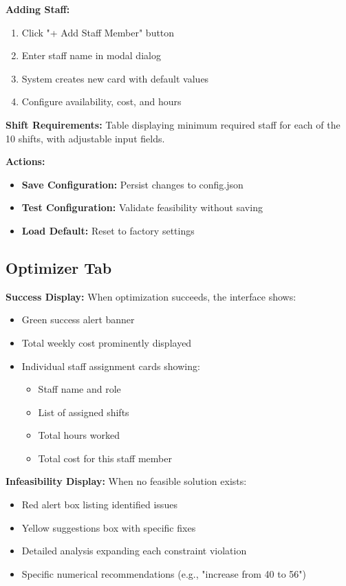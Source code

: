 \documentclass[12pt,a4paper]{article}
\begin{document}
\textbf{Adding Staff:}
\begin{enumerate}
    \item Click "+ Add Staff Member" button
    \item Enter staff name in modal dialog
    \item System creates new card with default values
    \item Configure availability, cost, and hours
\end{enumerate}

\textbf{Shift Requirements:}
Table displaying minimum required staff for each of the 10 shifts, with adjustable input fields.

\textbf{Actions:}
\begin{itemize}
    \item \textbf{Save Configuration:} Persist changes to config.json
    \item \textbf{Test Configuration:} Validate feasibility without saving
    \item \textbf{Load Default:} Reset to factory settings
\end{itemize}

\subsection{Optimizer Tab}

\textbf{Success Display:}
When optimization succeeds, the interface shows:
\begin{itemize}
    \item Green success alert banner
    \item Total weekly cost prominently displayed
    \item Individual staff assignment cards showing:
    \begin{itemize}
        \item Staff name and role
        \item List of assigned shifts
        \item Total hours worked
        \item Total cost for this staff member
    \end{itemize}
\end{itemize}

\textbf{Infeasibility Display:}
When no feasible solution exists:
\begin{itemize}
    \item Red alert box listing identified issues
    \item Yellow suggestions box with specific fixes
    \item Detailed analysis expanding each constraint violation
    \item Specific numerical recommendations (e.g., "increase from 40 to 56")
\end{itemize}
\end{document}

